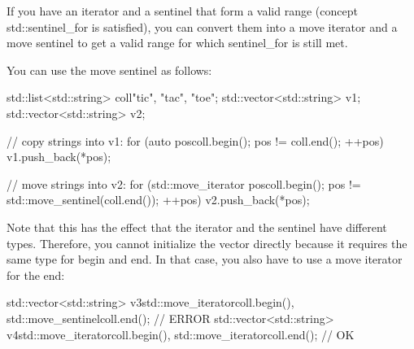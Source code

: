 If you have an iterator and a sentinel that form a valid range (concept std::sentinel\_for is satisfied), you can convert them into a move iterator and a move sentinel to get a valid range for which sentinel\_for is still met.

You can use the move sentinel as follows:

\begin{cpp}
std::list<std::string> coll{"tic", "tac", "toe"};
std::vector<std::string> v1;
std::vector<std::string> v2;

// copy strings into v1:
for (auto pos{coll.begin()}; pos != coll.end(); ++pos) {
	v1.push_back(*pos);
}

// move strings into v2:
for (std::move_iterator pos{coll.begin()};
pos != std::move_sentinel(coll.end()); ++pos) {
	v2.push_back(*pos);
}
\end{cpp}

Note that this has the effect that the iterator and the sentinel have different types. Therefore, you cannot initialize the vector directly because it requires the same type for begin and end. In that case, you also have to use a move iterator for the end:

\begin{cpp}
std::vector<std::string> v3{std::move_iterator{coll.begin()},
							std::move_sentinel{coll.end()}}; // ERROR
std::vector<std::string> v4{std::move_iterator{coll.begin()},
							std::move_iterator{coll.end()}}; // OK
\end{cpp}















